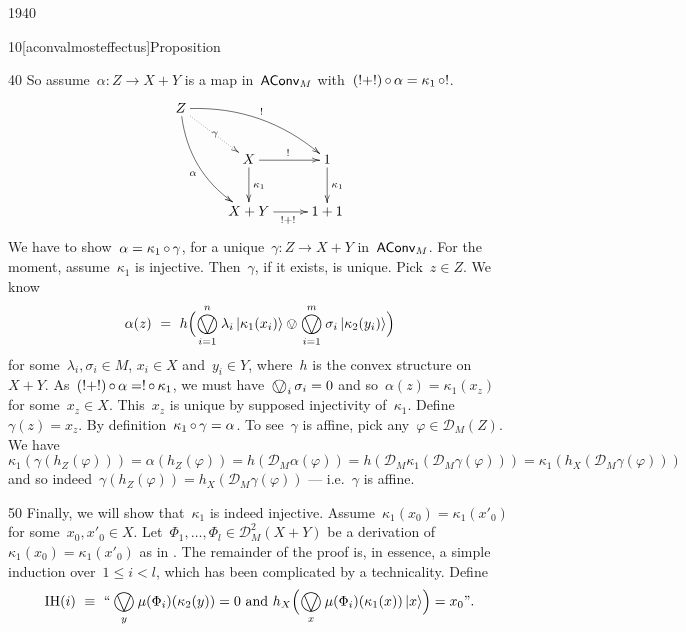\begin{parsec}{1940}
\begin{point}{10}[aconvalmosteffectus]{Proposition}
\begin{point}{40}
So assume~$\alpha \colon Z \to X+Y$
    is a map in~$\mathsf{AConv}_M$
    with~$(!+!) \mathop{\circ} \alpha = \kappa_1 \mathop{\circ} !$.
\begin{equation*}
\xymatrix{
    Z \ar@/^1pc/[rrd]^{!}
        \ar@/_1pc/[rdd]_\alpha
        \ar@{.>}[rd]|\gamma\\
        &X \ar[r]^{!} \ar[d]^{\kappa_1}
        & 1\ar[d]^{\kappa_1} \\
        &X+Y\ar[r]_{!+!} & 1+1
    }
\end{equation*}
We have to show~$\alpha = \kappa_1 \mathop{\circ} \gamma$,
    for a unique~$\gamma\colon Z \to X+Y$ in~$\mathsf{AConv}_M$.
For the moment, assume~$\kappa_1$ is injective.
Then~$\gamma$, if it exists, is unique.
Pick~$z \in Z$.
We know
\begin{equation*}
    \alpha(z) \ =\  h 
    \Bigl( \bigovee^n_{i=1} \lambda_i \ket{\kappa_1(x_i)}
    \ovee \bigovee^m_{i=1} \sigma_i \ket{\kappa_2(y_i)} \Bigr)
\end{equation*}
for some~$\lambda_i,\sigma_i \in M $, 
$x_i \in X$ and~$y_i \in Y$,
where~$h$ is the convex structure on~$X+Y$.
As~$(!+!) \mathop{\circ} \alpha = ! \mathop{\circ} \kappa_1$,
    we must have~$\bigovee_i \sigma_i = 0$
    and so~$\alpha(z) = \kappa_1(x_z)$
    for some~$x_z \in X$.
This~$x_z$ is unique by supposed injectivity of~$\kappa_1$.
    Define~$\gamma(z) = x_z$.
By definition~$\kappa_1 \mathop{\circ} \gamma = \alpha$.
To see~$\gamma$ is affine, pick any~$\varphi \in \mathcal{D}_M (Z)$.
We have
$
\kappa_1 ( \gamma ( h_Z (\varphi )))
    = \alpha(h_Z (\varphi))
    = h(\mathcal{D}_M\alpha(\varphi))
    = h(\mathcal{D}_M\kappa_1 ( \mathcal{D}_M \gamma(\varphi)))
    = \kappa_1  (h_X( \mathcal{D}_M \gamma(\varphi)))
$ and
so indeed~$\gamma(h_Z(\varphi)) = h_X(\mathcal{D}_M \gamma (\varphi))$
    --- i.e.~$\gamma$ is affine.
\end{point}
\begin{point}{50}%
Finally, we will show that~$\kappa_1$ is indeed injective.
Assume~$\kappa_1(x_0) = \kappa_1(x'_0)$
for some~$x_0,x'_0 \in X$.
    Let~$\Phi_1, \ldots, \Phi_l \in \mathcal{D}_M^2{(X+Y)}$
    be a derivation
    of~$\kappa_1(x_0) = \kappa_1(x'_0)$
    as in .
The remainder of the proof is, in essence, a simple induction
    over~$1 \leq i < l$, which has been complicated
    by a technicality.
Define
\begin{equation*}
    \mathrm{IH}(i) \ \equiv \ \text{``}
    \bigovee_y \mu(\Phi_i)(\kappa_2 (y)) = 0
        \text{ and }
        h_X\Bigl(\bigovee_{x} \mu(\Phi_i)(\kappa_1(x)) \ket{x}\Bigr)
        =    x_0 \text{''}.

\end{equation*}
\end{point}
\end{point}
\end{parsec}
